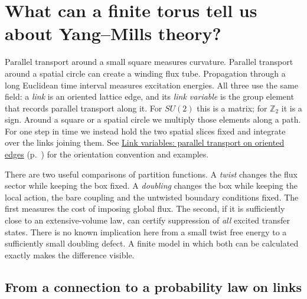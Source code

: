 \section{What can a finite torus tell us about Yang--Mills theory?}\label{ym:sec:finite-guide}

Parallel transport around a small square measures curvature. Parallel transport
around a spatial circle can create a winding flux tube. Propagation through a
long Euclidean time interval measures excitation energies. All three use the
same field: a \emph{link} is an oriented lattice edge, and its \emph{link
variable} is the group element that records parallel transport along it.
For $SU(2)$ this is a matrix; for $\mathbb Z_2$ it is a sign. Around a
square or a spatial circle we multiply those elements along a path. For
one step in time we instead hold the two spatial slices fixed and integrate
over the links joining them. See \hyperref[ym:sec:link-variables]{Link variables:
parallel transport on oriented edges} (p.~\pageref{ym:sec:link-variables})
for the orientation convention and examples.

There are two useful comparisons of partition functions. A \emph{twist}
changes the flux sector while keeping the box fixed. A \emph{doubling} changes
the box while keeping the local action, the bare coupling and the untwisted
boundary conditions fixed. The first measures the cost of imposing global
flux. The second, if it is sufficiently close to an extensive-volume law,
can certify suppression of \emph{all} excited transfer states. There is no
known implication here from a small twist free energy to a sufficiently small
doubling defect. A finite model in which both can be calculated exactly makes
the difference visible.

\subsection{From a connection to a probability law on links}
